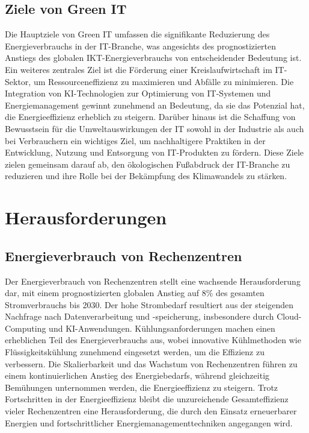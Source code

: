 \documentclass[12pt]{article}
\begin{document}
\subsection{Ziele von Green IT}
Die Hauptziele von Green IT umfassen die signifikante Reduzierung des Energieverbrauchs in der IT-Branche, was angesichts des prognostizierten Anstiegs des globalen IKT-Energieverbrauchs von entscheidender Bedeutung ist\cite{andrae2015}. Ein weiteres zentrales Ziel ist die Förderung einer Kreislaufwirtschaft im IT-Sektor, um Ressourceneffizienz zu maximieren und Abfälle zu minimieren\cite{geissdoerfer2010}. Die Integration von KI-Technologien zur Optimierung von IT-Systemen und Energiemanagement gewinnt zunehmend an Bedeutung, da sie das Potenzial hat, die Energieeffizienz erheblich zu steigern\cite{khan2021}. Darüber hinaus ist die Schaffung von Bewusstsein für die Umweltauswirkungen der IT sowohl in der Industrie als auch bei Verbrauchern ein wichtiges Ziel, um nachhaltigere Praktiken in der Entwicklung, Nutzung und Entsorgung von IT-Produkten zu fördern\cite{jenkin2011}. Diese Ziele zielen gemeinsam darauf ab, den ökologischen Fußabdruck der IT-Branche zu reduzieren und ihre Rolle bei der Bekämpfung des Klimawandels zu stärken.

\section{Herausforderungen}
\subsection{Energieverbrauch von Rechenzentren}
Der Energieverbrauch von Rechenzentren stellt eine wachsende Herausforderung dar, mit einem prognostizierten globalen Anstieg auf 8\% des gesamten Stromverbrauchs bis 2030\cite{andrae2015}. Der hohe Strombedarf resultiert aus der steigenden Nachfrage nach Datenverarbeitung und -speicherung, insbesondere durch Cloud-Computing und KI-Anwendungen\cite{masanet2020}. Kühlungsanforderungen machen einen erheblichen Teil des Energieverbrauchs aus, wobei innovative Kühlmethoden wie Flüssigkeitskühlung zunehmend eingesetzt werden, um die Effizienz zu verbessern\cite{oró2015}. Die Skalierbarkeit und das Wachstum von Rechenzentren führen zu einem kontinuierlichen Anstieg des Energiebedarfs, während gleichzeitig Bemühungen unternommen werden, die Energieeffizienz zu steigern\cite{jones2018}. Trotz Fortschritten in der Energieeffizienz bleibt die unzureichende Gesamteffizienz vieler Rechenzentren eine Herausforderung, die durch den Einsatz erneuerbarer Energien und fortschrittlicher Energiemanagementtechniken angegangen wird\cite{khan2021}.
\end{document}
